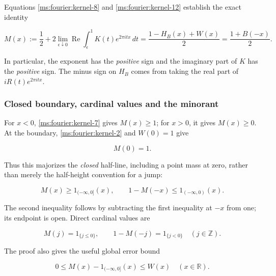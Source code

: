 Equations \eqref{ms:fourier:kernel-8} and \eqref{ms:fourier:kernel-12} establish the exact identity

\begin{equation}
 \boxed{\displaystyle
 M(x):=\frac12+2\lim_{\epsilon\downarrow0}\operatorname{Re}
       \int_\epsilon^1K(t)e^{2\pi itx}\,dt
       =\frac{1-H_B(x)+W(x)}2=\frac{1+B(-x)}2.}
 \label{ms:fourier:kernel-14}
\end{equation}

In particular, the exponent has the \emph{positive} sign and the imaginary
part of \(K\) has the \emph{positive} sign. The minus sign on \(H_B\) comes
from taking the real part of \(iR(t)e^{2\pi itx}\).

\subsubsection{Closed boundary, cardinal values and the minorant}

For \(x<0\), \eqref{ms:fourier:kernel-7} gives \(M(x)\ge1\); for \(x>0\), it gives
\(M(x)\ge0\). At the boundary, \eqref{ms:fourier:kernel-2} and \(W(0)=1\) give

\begin{equation}
 M(0)=1.                                             \label{ms:fourier:kernel-15}
\end{equation}

Thus this majorizes the \emph{closed} half-line, including a point mass at
zero, rather than merely the half-height convention for a jump:

\begin{equation}
 M(x)\ge1_{(-\infty,0]}(x),\qquad
 1-M(-x)\le1_{(-\infty,0)}(x).
 \label{ms:fourier:kernel-16}
\end{equation}

The second inequality follows by subtracting the first inequality at
\(-x\) from one; its endpoint is open. Direct cardinal values are

\begin{equation}
 M(j)=1_{\{j\le0\}},\qquad1-M(-j)=1_{\{j<0\}}
 \quad(j\in\mathbb Z).                              \label{ms:fourier:kernel-17}
\end{equation}

The proof also gives the useful global error bound

\begin{equation}
 0\le M(x)-1_{(-\infty,0]}(x)\le W(x)
 \quad(x\in\mathbb R).                              \label{ms:fourier:kernel-18}
\end{equation}

